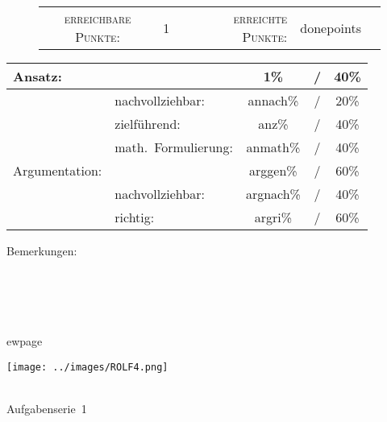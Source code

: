 \documentclass{article}
\begin{document}
\vspace{-0.5cm}
\begin{figure}[h!]
\begin{tabular}{crcrcr}
\textsc{erreichbare Punkte:} &1& & \textsc{erreichte Punkte:} &donepoints
\end{tabular}
\end{figure}
\vspace{-0.1cm}
\begin{minipage}[t]{0.6\textwidth}
\flushleft
\begin{tabular}{l|lccc}
Ansatz:& &1\%&/&40\%\\\hline
&nachvollziehbar:&annach\%&/&20\%\\
&zielf{\"u}hrend:&anz\%&/&40\%\\
&math.~Formulierung:& anmath\%&/&40\%\\\hline\hline
Argumentation:& &arggen\%&/&60\%\\\hline
&nachvollziehbar:&argnach\%&/&40\%\\
&richtig:&argri\%&/&60\%\\\hline
\end{tabular}
\end{minipage}
\hfill
\begin{minipage}[t]{0.4\textwidth}
	\vspace{-1.75cm}
	Bemerkungen:\\\vspace*{0.2cm}
	\underline{\hspace{0.75\textwidth}}\\\vspace*{0.2cm}
	\underline{\hspace{0.75\textwidth}}
	\\\vspace*{0.2cm}
	\underline{\hspace{0.75\textwidth}}
	\\\vspace*{0.2cm}
	\underline{\hspace{0.75\textwidth}}
	\\\vspace*{0.2cm}
	\underline{\hspace{0.75\textwidth}}
\end{minipage}
	\vspace{0.5cm}
ewpage\vspace*{-2cm}
\parbox{4cm}{\texttt{[image: ../images/ROLF4.png]}}
\parbox{10.6cm}{ \\ Aufgabenserie~1  \\ \vspace*{-.5cm} }
\end{document}
